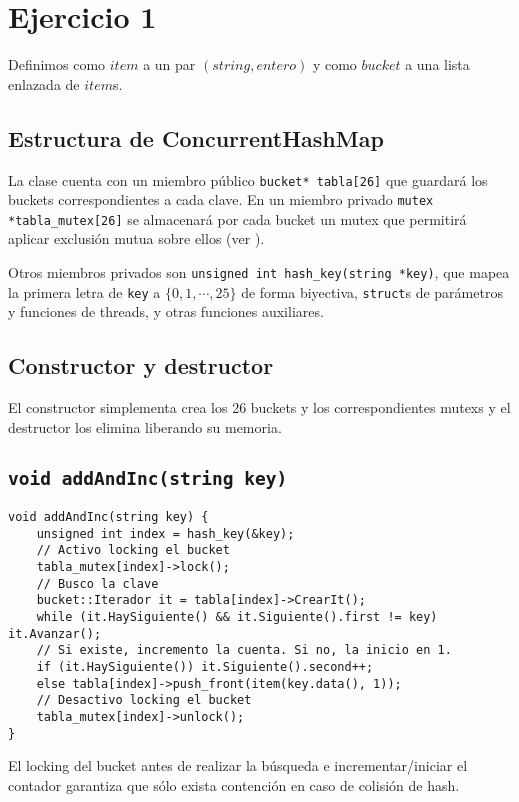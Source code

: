 \section{Ejercicio 1}

Definimos como $item$ a un par $(string, entero)$ y como $bucket$ a una lista enlazada de $item$s.


\subsection{Estructura de ConcurrentHashMap}

La clase cuenta con un miembro público \texttt{bucket* tabla[26]} que guardará los buckets correspondientes a cada clave. En un miembro privado \texttt{mutex *tabla_mutex[26]} se almacenará por cada bucket un mutex que permitirá aplicar exclusión mutua sobre ellos (ver \cite{cppref-mutex}).

Otros miembros privados son \texttt{unsigned int hash_key(string *key)}, que mapea la primera letra de \texttt{key} a $\{ 0, 1, \cdots, 25 \}$ de forma biyectiva, \texttt{struct}s de parámetros y funciones de threads, y otras funciones auxiliares.


\subsection{Constructor y destructor}

El constructor simplementa crea los 26 buckets y los correspondientes mutexs y el destructor los elimina liberando su memoria.


\subsection{\texttt{void addAndInc(string key)}}

\begin{verbatim}
void addAndInc(string key) {
	unsigned int index = hash_key(&key);
	// Activo locking el bucket
	tabla_mutex[index]->lock();
	// Busco la clave
	bucket::Iterador it = tabla[index]->CrearIt();
	while (it.HaySiguiente() && it.Siguiente().first != key) it.Avanzar();
	// Si existe, incremento la cuenta. Si no, la inicio en 1.
	if (it.HaySiguiente()) it.Siguiente().second++;
	else tabla[index]->push_front(item(key.data(), 1));
	// Desactivo locking el bucket
	tabla_mutex[index]->unlock();
}
\end{verbatim}

El locking del bucket antes de realizar la búsqueda e incrementar/iniciar el contador garantiza que sólo exista contención en caso de colisión de hash.


